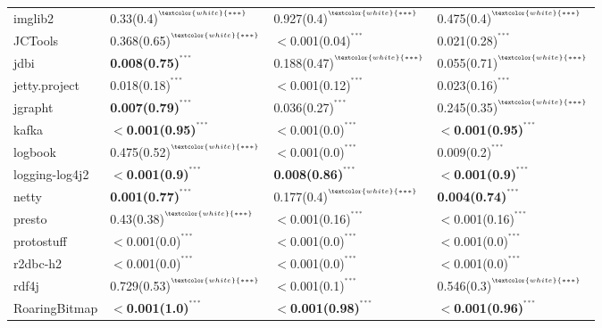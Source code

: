 \begin{tabular}{llll}
imglib2             &  0.33(0.4)\tiny{$^{^{\textcolor{white}{***}}}$} &  0.927(0.4)\tiny{$^{^{\textcolor{white}{***}}}$} &  0.475(0.4)\tiny{$^{^{\textcolor{white}{***}}}$} \\
JCTools             &  0.368(0.65)\tiny{$^{^{\textcolor{white}{***}}}$} &  $<$0.001(0.04)\tiny{$^{^{***}}$} &  0.021(0.28)\tiny{$^{^{***}}$} \\
jdbi                &  \textbf{0.008(0.75)}\tiny{$^{^{***}}$} &  0.188(0.47)\tiny{$^{^{\textcolor{white}{***}}}$} &  0.055(0.71)\tiny{$^{^{\textcolor{white}{***}}}$} \\
jetty.project       &  0.018(0.18)\tiny{$^{^{***}}$} &  $<$0.001(0.12)\tiny{$^{^{***}}$} &  0.023(0.16)\tiny{$^{^{***}}$} \\
jgrapht             &  \textbf{0.007(0.79)}\tiny{$^{^{***}}$} &  0.036(0.27)\tiny{$^{^{***}}$} &  0.245(0.35)\tiny{$^{^{\textcolor{white}{***}}}$} \\
kafka               &  \textbf{$<$0.001(0.95)}\tiny{$^{^{***}}$} &  $<$0.001(0.0)\tiny{$^{^{***}}$} &  \textbf{$<$0.001(0.95)}\tiny{$^{^{***}}$} \\
logbook             &  0.475(0.52)\tiny{$^{^{\textcolor{white}{***}}}$} &  $<$0.001(0.0)\tiny{$^{^{***}}$} &  0.009(0.2)\tiny{$^{^{***}}$} \\
logging-log4j2      &  \textbf{$<$0.001(0.9)}\tiny{$^{^{***}}$} &  \textbf{0.008(0.86)}\tiny{$^{^{***}}$} &  \textbf{$<$0.001(0.9)}\tiny{$^{^{***}}$} \\
netty               &  \textbf{0.001(0.77)}\tiny{$^{^{***}}$} &  0.177(0.4)\tiny{$^{^{\textcolor{white}{***}}}$} &  \textbf{0.004(0.74)}\tiny{$^{^{***}}$} \\
presto              &  0.43(0.38)\tiny{$^{^{\textcolor{white}{***}}}$} &  $<$0.001(0.16)\tiny{$^{^{***}}$} &  $<$0.001(0.16)\tiny{$^{^{***}}$} \\
protostuff          &  $<$0.001(0.0)\tiny{$^{^{***}}$} &  $<$0.001(0.0)\tiny{$^{^{***}}$} &  $<$0.001(0.0)\tiny{$^{^{***}}$} \\
r2dbc-h2            &  $<$0.001(0.0)\tiny{$^{^{***}}$} &  $<$0.001(0.0)\tiny{$^{^{***}}$} &  $<$0.001(0.0)\tiny{$^{^{***}}$} \\
rdf4j               &  0.729(0.53)\tiny{$^{^{\textcolor{white}{***}}}$} &  $<$0.001(0.1)\tiny{$^{^{***}}$} &  0.546(0.3)\tiny{$^{^{\textcolor{white}{***}}}$} \\
RoaringBitmap       &  \textbf{$<$0.001(1.0)}\tiny{$^{^{***}}$} &  \textbf{$<$0.001(0.98)}\tiny{$^{^{***}}$} &  \textbf{$<$0.001(0.96)}\tiny{$^{^{***}}$} \\

\end{tabular}
